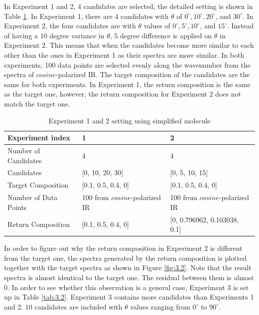 In Experiment 1 and 2, $4$ candidates are selected, the detailed setting is shown in Table \ref{tab:3.1}. In Experiment 1, there are $4$ candidates with $\theta$ of $0^{\circ}, 10^{\circ}, 20^{\circ}$, and $30^{\circ}$. In Experiment 2, the four candidates are with $\theta$ values of $0^{\circ}, 5^{\circ}, 10^{\circ}$, and $15^{\circ}$. Instead of having a $10$ degree variance in $\theta$, $5$ degree difference is applied on $\theta$ in Experiment 2. This means that when the candidates become more similar to each other than the ones in Experiment 1 as their spectra are more similar. In both experiments, 100 data points are selected evenly along the wavenumber from the spectra of $cosine$-polarized IR. The target composition of the candidates are the same for both experiments. In Experiment 1, the return composition is the same as the target one, however, the return composition for Experiment 2 does not match the target one. \\

\begin{table} 
\begin{center}
\begin{tabular}{| l | l | l | }
\hline
Experiment index & 1 & 2  \\
\hline
Number of Candidates & 4 & 4  \\
\hline
Candidates & [0, 10, 20, 30] & [0, 5, 10, 15] \\
\hline
Target Composition & [0.1, 0.5, 0.4, 0] & [0.1, 0.5, 0.4, 0]     \\
\hline
Number of Data Points & 100 from $cosine$-polarized IR &  100 from $cosine$-polarized IR     \\
\hline
Return Composition & [0.1, 0.5, 0.4, 0] & [0, 0.796962, 0.103038, 0.1] \\
\hline
\end{tabular} 
\end{center}
\caption{Experiment 1 and 2 setting using simplified molecule}
\label{tab:3.1}
\end{table}	

In order to figure out why the return composition in Experiment 2 is different from the target one, the spectra generated by the return composition is plotted together with the target spectra as shown in Figure \ref{fig:3.2}. Note that the result spectra is almost identical to the target one. The residual between them is almost $0$. In order to see whether this observation is a general case, Experiment 3 is set up in Table \ref{tab:3.2}. Experiment 3 contains more candidates than Experiments 1 and 2. $10$ candidates are included with $\theta$ values ranging from $0^{\circ}$ to $90^{\circ}$.  \\

